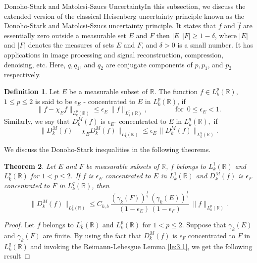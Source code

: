 \documentclass[12pt,a4paper,reqno]{amsproc}
\newtheorem{theorem}{Theorem}[section]
\theoremstyle{definition}
\newtheorem{definition}[theorem]{Definition}
\theoremstyle{remark}
\numberwithin{equation}{section}
\begin{document}
\begin{subsection}{Donoho-Stark and Matolcsi-Szucs Uncertainty}In this subsection, we discuss the
extended version of the classical Heisenberg uncertainty principle known as the Donoho-Stark \cite{donoho1989uncertainty} and Matolcsi-Szucs uncertainty principle. It states that  $f$ and  $\hat{f}$ are essentially zero outside a measurable set $E$ and  $F$ then $|E|\,|F| \ge 1- \delta$, where $|E|$ and $|F|$ denotes the measures of sets $E$ and $F$, and $\delta>0$ is a small number.  It has applications in image processing and signal reconstruction, compression, denoising, etc. Here, $q,q_1$, and $q_2$  are conjugate components of $p,p_1$, and $p_2$ respectively.
\begin{definition}
Let $E$  be a measurable subset of $\mathbb{R}$. The function $f\in L_k^p(\mathbb{R})$, $1\le p\le 2$  is said to be $\epsilon_E$ - concentrated to $E$ in $L_k^p(\mathbb{R})$, if
\begin{equation*}\label{6.1}
    \|f-\chi_Ef\|_{L^p_k(\mathbb{R})}\le \epsilon_E\, \|f\|_{L^p_k(\mathbb{R})},\qquad\qquad \text{for}\,   \,\,0\le \epsilon_E <1.
\end{equation*}
Similarly, we say that $D_k^M(f)$ is $\epsilon_E$- concentrated to $E$ in $L_k^{q}(\mathbb{R}),$ if 
\begin{equation*}\label{6.2}
    \|D_k^M(f)- \chi_ED_k^M(f)\|_{L_k^{q}(\mathbb{R})} \le \epsilon_E\, \|D_k^M(f)\|_{L_k^{q}(\mathbb{R})}.
\end{equation*}
\end{definition}
We discuss the Donoho-Stark inequalities in the following theorems.
 \begin{theorem}
  Let $E$ and $F$ be measurable subsets of $\mathbb{R}$, $f$ belongs to $L_k^1(\mathbb{R})$ and $L^p_k(\mathbb{R})$ for  $1<p\le 2 $. If $f$ is $\epsilon_E$ concentrated to $E$ in $L_k^1(\mathbb{R})$ and $D_k^M(f)$ is $\epsilon_{F}$ concentrated to $F$ in $L_k^{q}(\mathbb{R})$, then 
 \begin{equation*}
     \|D_k^M(f)\|_{L_k^{q}(\mathbb{R})}\le C_{k,b}\,\frac{(\gamma_k(F))^{\frac{1}{q}}\, (\gamma_k(E))^{\frac{1}{q}}}{(1-\epsilon_E)\,(1-\epsilon_{F})}\,\|f\|_{L_k^{p}(\mathbb{R})}.
 \end{equation*}
\end{theorem} 
\begin{proof}
    Let $f$ belongs to $L_k^1(\mathbb{R})$ and $ L_k^p(\mathbb{R})$ for $1<p\le 2$.  Suppose that $\gamma_k(E)$ and $\gamma_k(F)$ are finite. By using the fact that $D_k^M(f)$ is $\epsilon_{F}$ concentrated to $F$ in $L_k^{q}(\mathbb{R})$ and invoking the Reimann-Lebesgue Lemma \ref{le:3.1}, we get the following result

\end{proof}
\end{subsection}
\end{document}
